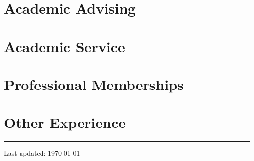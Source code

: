 \documentclass[11pt]{article} %
\newcommand*{\pubnewline}{\unskip\nobreak\hfil\break}
\let\\\pubnewline
\begin{document}
\section*{Academic Advising}
\label{advising}



\section*{Academic Service}
\label{service}



\section*{Professional Memberships}
\label{memberships}



\section*{Other Experience}
\label{exp_other}



\centering
\rule{0.25\linewidth}{0.4pt}\\
\medskip
Last updated: \today
\end{document}
